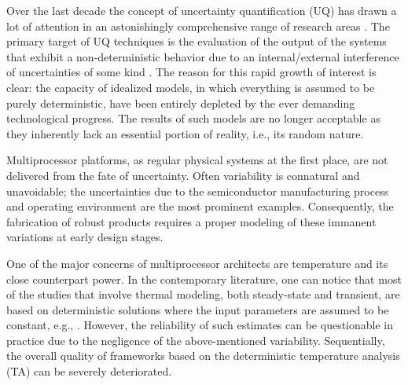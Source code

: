 Over the last decade the concept of uncertainty quantification (UQ) has drawn a lot of attention in an astonishingly comprehensive range of research areas \cite{xiu2009}. The primary target of UQ techniques is the evaluation of the output of the systems that exhibit a non-deterministic behavior due to an internal/external interference of uncertainties of some kind \cite{eldred2009}. The reason for this rapid growth of interest is clear: the capacity of idealized models, in which everything is assumed to be purely deterministic, have been entirely depleted by the ever demanding technological progress. The results of such models are no longer acceptable as they inherently lack an essential portion of reality, i.e., its random nature.

Multiprocessor platforms, as regular physical systems at the first place, are not delivered from the fate of uncertainty. Often variability is connatural and unavoidable; the uncertainties due to the semiconductor manufacturing process and operating environment are the most prominent examples. Consequently, the fabrication of robust products requires a proper modeling of these immanent variations at early design stages.

One of the major concerns of multiprocessor architects are temperature and its close counterpart power. In the contemporary literature, one can notice that most of the studies that involve thermal modeling, both steady-state and transient, are based on deterministic solutions where the input parameters are assumed to be constant, e.g., \cite{ukhov2012}. However, the reliability of such estimates can be questionable in practice due to the negligence of the above-mentioned variability. Sequentially, the overall quality of frameworks based on the deterministic temperature analysis (TA) can be severely deteriorated.


